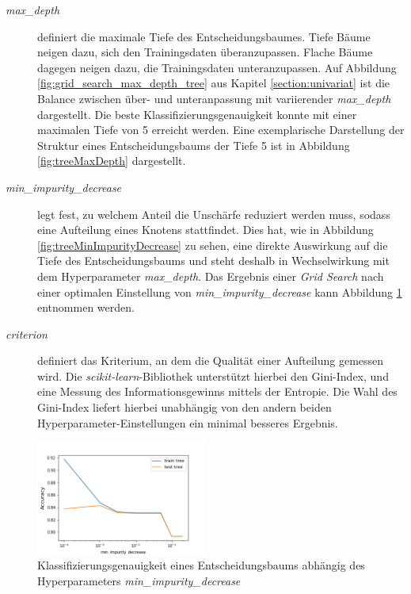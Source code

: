 \begin{description}
	\item[\emph{max\_depth}]
	 definiert die maximale Tiefe des Entscheidungsbaumes. Tiefe Bäume neigen dazu, sich den Trainingsdaten überanzupassen. Flache Bäume dagegen neigen dazu, die Trainingsdaten unteranzupassen. Auf Abbildung \ref{fig:grid_search_max_depth_tree} aus Kapitel \ref{section:univariat} ist die Balance zwischen über- und unteranpassung mit variierender \emph{max\_depth} dargestellt. Die beste Klassifizierungsgenauigkeit konnte mit einer maximalen Tiefe von 5 erreicht werden. Eine exemplarische Darstellung der Struktur eines Entscheidungsbaums der Tiefe 5 ist in Abbildung \ref{fig:treeMaxDepth} dargestellt.

	\item[\emph{min\_impurity\_decrease}] 
	legt fest, zu welchem Anteil die Unschärfe reduziert werden muss, sodass eine Aufteilung eines Knotens stattfindet. Dies hat, wie in Abbildung \ref{fig:treeMinImpurityDecrease} zu sehen, eine direkte Auswirkung auf die Tiefe des Entscheidungsbaums und steht deshalb in Wechselwirkung mit dem Hyperparameter \emph{max\_depth}. Das Ergebnis einer \emph{Grid Search} nach einer optimalen Einstellung von \emph{min\_impurity\_decrease} kann Abbildung \ref{fig:grid_search_impurity_decrease} entnommen werden.
	
	\item[\emph{criterion}]
	definiert das Kriterium, an dem die Qualität einer Aufteilung gemessen wird. Die \emph{scikit-learn}-Bibliothek unterstützt hierbei den Gini-Index, und eine Messung des Informationsgewinns mittels der Entropie. Die Wahl des Gini-Index liefert hierbei unabhängig von den andern beiden Hyperparameter-Einstellungen ein minimal besseres Ergebnis.
\end{description}

\begin{figure}[ht]
	\centering
	\includegraphics[width = 0.5\textwidth]{Bilder/min_impurity_decrease.png}
	\caption{Klassifizierungsgenauigkeit eines Entscheidungsbaums abhängig des Hyperparameters \emph{min\_impurity\_decrease}}
	\label{fig:grid_search_impurity_decrease}
\end{figure}

